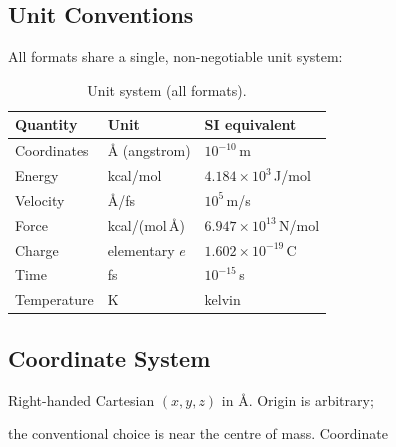 \documentclass[12pt, a4paper, oneside]{article}
\begin{document}
\subsection{Unit Conventions}


All formats share a single, non-negotiable unit system:


\begin{table}[htbp]

  \centering

  \caption{Unit system (all formats).}

  \label{tab:units}

  \begin{tabular}{lll}

    \toprule

    Quantity & Unit & SI equivalent \\

    \midrule

    Coordinates   & \AA{} (angstrom) & $10^{-10}$\,m \\

    Energy        & kcal/mol         & $4.184 \times 10^{3}$\,J/mol \\

    Velocity      & \AA/fs           & $10^{5}$\,m/s \\

    Force         & kcal/(mol\,\AA)  & $6.947 \times 10^{13}$\,N/mol \\

    Charge        & elementary $e$   & $1.602 \times 10^{-19}$\,C \\

    Time          & fs               & $10^{-15}$\,s \\

    Temperature   & K                & kelvin \\

    \bottomrule

  \end{tabular}

\end{table}


\subsection{Coordinate System}


Right-handed Cartesian $(x, y, z)$ in \AA.  Origin is arbitrary;

the conventional choice is near the centre of mass.  Coordinate
\end{document}
